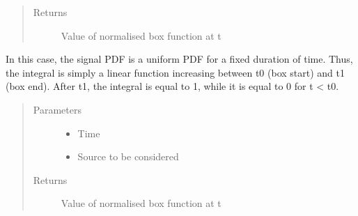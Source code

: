 \documentclass[letterpaper,10pt,english]{sphinxmanual}
\begin{document}
\begin{fulllineitems}
\begin{fulllineitems}
\begin{quote}
\begin{description}
\begin{itemize}
\end{itemize}

\item[{Returns}] \leavevmode
Value of normalised box function at t

\end{description}\end{quote}

\end{fulllineitems}


\begin{fulllineitems}
\label{\detokenize{index:flarestack.core.time_pdf.Box.signal_integral}}
In this case, the signal PDF is a uniform PDF for a fixed duration of
time. Thus, the integral is simply a linear function increasing
between t0 (box start) and t1 (box end). After t1, the integral is
equal to 1, while it is equal to 0 for t \textless{} t0.
\begin{quote}\begin{description}
\item[{Parameters}] \leavevmode\begin{itemize}
\item {} 
 \textendash{} Time

\item {} 
 \textendash{} Source to be considered

\end{itemize}

\item[{Returns}] \leavevmode
Value of normalised box function at t

\end{description}\end{quote}

\end{fulllineitems}


\end{fulllineitems}

\end{document}
